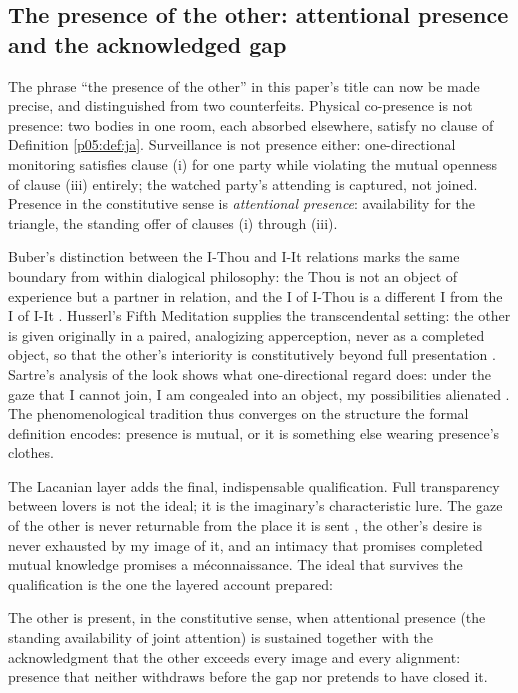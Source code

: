 \subsection{The presence of the other: attentional presence and the acknowledged gap}
\label{p05:sec:presence}

The phrase ``the presence of the other'' in this paper's title can now be made precise, and distinguished from two counterfeits. Physical co-presence is not presence: two bodies in one room, each absorbed elsewhere, satisfy no clause of Definition \ref{p05:def:ja}. Surveillance is not presence either: one-directional monitoring satisfies clause (i) for one party while violating the mutual openness of clause (iii) entirely; the watched party's attending is captured, not joined. Presence in the constitutive sense is \emph{attentional presence}: availability for the triangle, the standing offer of clauses (i) through (iii).

Buber's distinction between the I-Thou and I-It relations marks the same boundary from within dialogical philosophy: the Thou is not an object of experience but a partner in relation, and the I of I-Thou is a different I from the I of I-It \parencite{buber1970}. Husserl's Fifth Meditation supplies the transcendental setting: the other is given originally in a paired, analogizing apperception, never as a completed object, so that the other's interiority is constitutively beyond full presentation \parencite{husserl1960}. Sartre's analysis of the look shows what one-directional regard does: under the gaze that I cannot join, I am congealed into an object, my possibilities alienated \parencite{sartre1956}. The phenomenological tradition thus converges on the structure the formal definition encodes: presence is mutual, or it is something else wearing presence's clothes.

The Lacanian layer adds the final, indispensable qualification. Full transparency between lovers is not the ideal; it is the imaginary's characteristic lure. The gaze of the other is never returnable from the place it is sent \parencite{lacan1977xi}, the other's desire is never exhausted by my image of it, and an intimacy that promises completed mutual knowledge promises a m\'econnaissance. The ideal that survives the qualification is the one the layered account prepared:

\begin{defn}\label{p05:def:presence}
The other is present, in the constitutive sense, when attentional presence (the standing availability of joint attention) is sustained together with the acknowledgment that the other exceeds every image and every alignment: presence that neither withdraws before the gap nor pretends to have closed it.
\end{defn}

